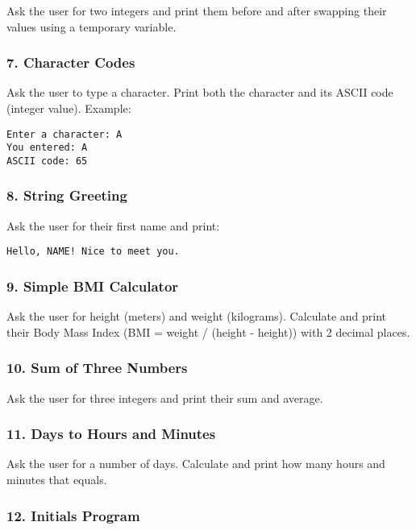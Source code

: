 \documentclass[
  letterpaper,
  DIV=11,
  numbers=noendperiod]{scrreprt}
\begin{document}
Ask the user for two integers and print them before and after swapping
their values using a temporary variable.

\subsubsection{7. Character Codes}\label{character-codes}

Ask the user to type a character. Print both the character and its ASCII
code (integer value). Example:

\begin{verbatim}
Enter a character: A
You entered: A
ASCII code: 65
\end{verbatim}

\subsubsection{8. String Greeting}\label{string-greeting}

Ask the user for their first name and print:

\begin{verbatim}
Hello, NAME! Nice to meet you.
\end{verbatim}

\subsubsection{9. Simple BMI Calculator}\label{simple-bmi-calculator}

Ask the user for height (meters) and weight (kilograms). Calculate and
print their Body Mass Index (BMI = weight / (height - height)) with 2
decimal places.

\subsubsection{10. Sum of Three Numbers}\label{sum-of-three-numbers}

Ask the user for three integers and print their sum and average.

\subsubsection{11. Days to Hours and
Minutes}\label{days-to-hours-and-minutes}

Ask the user for a number of days. Calculate and print how many hours
and minutes that equals.

\subsubsection{12. Initials Program}\label{initials-program}
\end{document}
